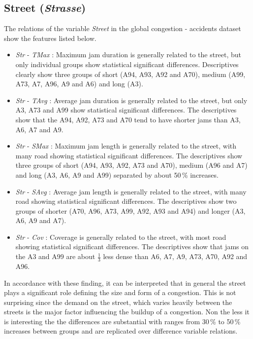 \subsection{Street (\textit{Strasse})}
\label{analysis_sum_Strasse}
The relations of the variable \textit{Street} in the global congestion -  accidents dataset show the features listed below.
\begin{itemize}
    \item \textit{Str} - \textit{TMax} : Maximum jam duration is generally related to the street, but only individual groups show statistical significant differences. Descriptives clearly show three groups of short (A94, A93, A92 and A70), medium (A99, A73, A7, A96, A9 and A6) and long (A3).
    \item \textit{Str} - \textit{TAvg} : Average jam duration is generally related to the street, but only A3, A73 and A99 show statistical significant differences. The descriptives show that the A94, A92, A73 and A70 tend to have shorter jams than A3, A6, A7 and A9.
    \item \textit{Str} - \textit{SMax} : Maximum jam length is generally related to the street, with many road showing statistical significant differences. The descriptives show three groups of short (A94, A93, A92, A73 and A70), medium (A96 and A7) and long (A3, A6, A9 and A99) separated by about 50\,\% increases.
    \item \textit{Str} - \textit{SAvg} : Average jam length is generally related to the street, with many road showing statistical significant differences. The descriptives show two groups of shorter (A70, A96, A73, A99, A92, A93 and A94) and longer (A3, A6, A9 and A7).
    \item \textit{Str} - \textit{Cov} : Coverage is generally related to the street, with most road showing statistical significant differences. The descriptives show that jams on the A3 and A99 are about $\frac{1}{3}$ less dense than A6, A7, A9, A73, A70, A92 and A96.
\end{itemize}
In accordance with these finding, it can be interpreted that in general the street plays a significant role defining the size and form of a congestion. This is not surprising since the demand on the street, which varies heavily between the streets is the major factor influencing the buildup of a congestion. Non the less it is interesting the the differences are substantial with ranges from 30\,\% to 50\,\% increases between groups and are replicated over difference variable relations.

